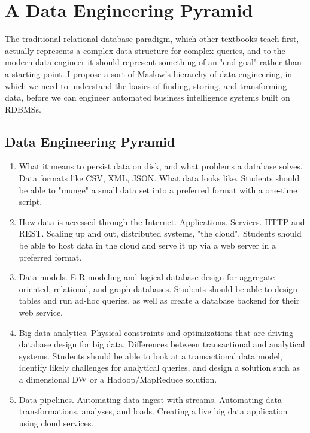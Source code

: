 \documentclass[11pt]{book}
\begin{document}
\section*{A Data Engineering Pyramid}

The traditional relational database paradigm, which other textbooks teach first, actually represents a complex data structure for complex queries, and to the modern data engineer it should represent something of an "end goal" rather than a starting point.  I propose a sort of Maslow's hierarchy of data engineering, in which we need to understand the basics of finding, storing, and transforming data, before we can engineer automated business intelligence systems built on RDBMSs.

\subsection*{Data Engineering Pyramid} 
\begin{enumerate}
    \item What it means to persist data on disk, and what problems a database solves. Data formats like CSV, XML, JSON.  What data looks like.  Students should be able to "munge" a small data set into a preferred format with a one-time script.
    \item How data is accessed through the Internet. Applications. Services. HTTP and REST.  Scaling up and out, distributed systems, "the cloud".  Students should be able to host data in the cloud and serve it up via a web server in a preferred format.
    \item Data models.  E-R modeling and logical database design for aggregate-oriented, relational, and graph databases.  Students should be able to design tables and run ad-hoc queries, as well as create a database backend for their web service.
    \item Big data analytics.  Physical constraints and optimizations that are driving database design for big data.  Differences between transactional and analytical systems.  Students should be able to look at a transactional data model, identify likely challenges for analytical queries, and design a solution such as a dimensional DW or a Hadoop/MapReduce solution.
    \item Data pipelines.  Automating data ingest with streams.  Automating data transformations, analyses, and loads.  Creating a live big data application using cloud services.
\end{enumerate}
\end{document}
